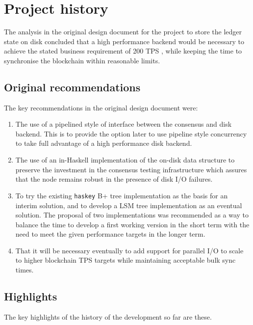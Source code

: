 \documentclass[11pt,a4paper]{article}
\begin{document}
\section{Project history}

The analysis in the original design document for the project to store the
ledger state on disk \citep{utxo-db} concluded that a high performance backend
would be necessary to achieve the stated business requirement of 200 TPS
\citep[Sections 3.1, 5.7]{utxo-db}, while keeping the time to synchronise the
blockchain within reasonable limits.

\subsection{Original recommendations}

The key recommendations in the original design document
\citep[Section 9]{utxo-db} were:
\begin{enumerate}
\item The use of a pipelined style of interface between the consensus and
      disk backend. This is to provide the option later to use pipeline style
      concurrency to take full advantage of a high performance disk backend.
\item The use of an in-Haskell implementation of the on-disk data structure to
      preserve the investment in the consensus testing infrastructure which
      assures that the node remains robust in the presence of disk I/O failures.
\item To try the existing \texttt{haskey} B+ tree implementation as the basis
      for an interim solution, and to develop a LSM tree implementation as an
      eventual solution. The proposal of two implementations was recommended as
      a way to balance the time to develop a first working version in the short
      term with the need to meet the given performance targets in the longer
      term.
\item That it will be necessary eventually to add support for parallel I/O to
      scale to higher blockchain TPS targets while maintaining acceptable bulk
      sync times.
\end{enumerate}

\subsection{Highlights}

The key highlights of the history of the development so far are these.
\end{document}

